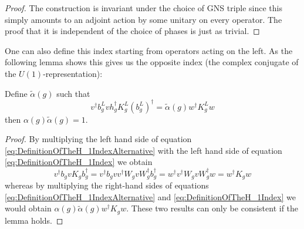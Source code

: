 \documentclass[11pt,a4paper,twoside]{article}
\numberwithin{equation}{section}
\begin{document}
	\begin{proof}
		The construction is invariant under the choice of GNS triple since this simply amounts to an adjoint action by some unitary on every operator. The proof that it is independent of the choice of phases is just as trivial.
	\end{proof}
	One can also define this index starting from operators acting on the left. As the following lemma shows this gives us the opposite index (the complex conjugate of the $U(1)$-representation):
	\begin{lemma}
		Define $\tilde{\alpha}(g)$ such that
		\begin{equation}\label{eq:DefinitionOfTheH_1IndexAlternative}
			v^\dagger b_g^L v h_g^\dagger K_g^L (b_g^L)^\dagger=\tilde{\alpha}(g)w^\dagger K_g^L w
		\end{equation}
		then $\alpha(g)\tilde{\alpha}(g)=1$.
	\end{lemma}
	\begin{proof}
		By multiplying the left hand side of equation \eqref{eq:DefinitionOfTheH_1IndexAlternative} with the left hand side of equation \eqref{eq:DefinitionOfTheH_1Index} we obtain
		\begin{equation}
			v^\dagger b_g v K_g b_g^\dagger=v^\dagger b_g v v^\dagger W_g v W_g^\dagger b_g^\dagger=w^\dagger v^\dagger W_g v W_g^\dagger w=w^\dagger K_g w
		\end{equation}
		whereas by multiplying the right-hand sides of equations \eqref{eq:DefinitionOfTheH_1IndexAlternative} and \eqref{eq:DefinitionOfTheH_1Index} we would obtain $\alpha(g)\tilde{\alpha}(g)w^\dagger K_g w$. These two results can only be consistent if the lemma holds.
	\end{proof}
\end{document}
